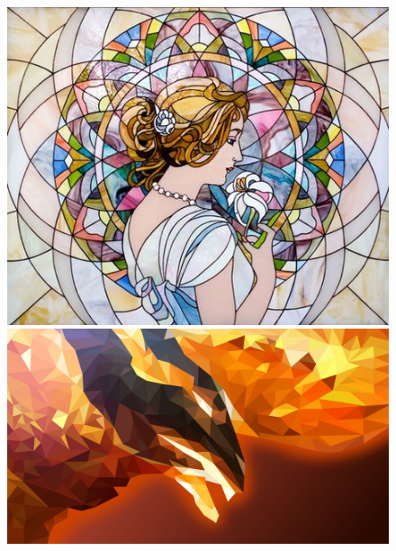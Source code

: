 \documentclass[17pt]{extarticle}
\begin{document}
\begin{figure}
\begin{minipage}{.5\textwidth}
\end{minipage}%
\begin{minipage}{.5\textwidth}
  	\includegraphics[scale=1.0]{mosaic.jpg}
  	\includegraphics[scale=0.22]{polyphoenix.jpg}
\end{minipage}
\end{figure}
\end{document}

